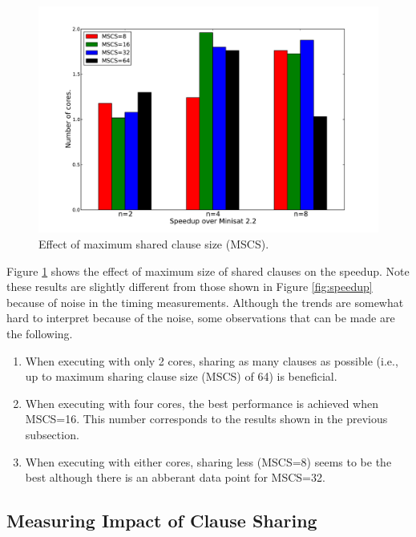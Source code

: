 \documentclass[letterpaper, compsoc, conference]{IEEEtran}
\begin{document}
\begin{figure}[htbp]
    \begin{center}
        \includegraphics[width=\columnwidth]{images/mcs.pdf}
        \caption{Effect of maximum shared clause size (MSCS).}
        \label{fig:mscs}
    \end{center}
\end{figure}

Figure \ref{fig:mscs} shows the effect of maximum size of shared clauses on the
speedup. Note these results are slightly different from those shown in Figure
\ref{fig:speedup} because of noise in the timing measurements. Although the
trends are somewhat hard to interpret because of the noise, some observations
that can be made are the following.

\begin{enumerate}

\item When executing with only 2 cores, sharing as many clauses as possible
(i.e., up to maximum sharing clause size (MSCS) of 64) is beneficial.

\item When executing with four cores, the best performance is achieved when
MSCS=16. This number corresponds to the results shown in the previous
subsection.

\item When executing with either cores, sharing less (MSCS=8) seems to be the
best although there is an abberant data point for MSCS=32.
      
\end{enumerate}

\subsection{Measuring Impact of Clause Sharing}
\end{document}
